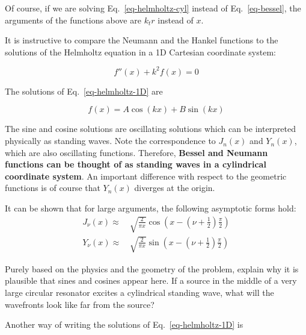 Of course, if we are solving Eq.~\ref{eq-helmholtz-cyl} instead of Eq.~\ref{eq-bessel}, the arguments of the functions above are $k_t r$ instead of $x$.

\pagebreak


It is instructive to compare the Neumann and the Hankel functions to the solutions of the Helmholtz equation in a 1D Cartesian coordinate system:

\begin{equation}
f''(x) + k^2 f(x) = 0 \label{eq-helmholtz-1D}
\end{equation} 

The solutions of Eq.~\ref{eq-helmholtz-1D} are

\begin{equation}
f(x) = A \cos(kx) + B \sin(kx)
\end{equation} 

The sine and cosine solutions are oscillating solutions which can be interpreted physically as standing waves. Note the correspondence to $J_n(x)$ and $Y_n(x)$, which are also oscillating functions. Therefore, \textbf{Bessel and Neumann functions can be thought of as standing waves in a cylindrical coordinate system}. An important difference with respect to the geometric functions is of course that $Y_n(x)$ diverges at the origin.

\begin{exer}
  It can be shown that for large arguments, the following asymptotic forms hold:
\begin{align}
J_\nu(x) \approx & \, \sqrt{\frac{2}{\pi x}} \cos \left( x - \left(\nu + \frac{1}{2}\right)\frac{\pi}{2} \right) \nonumber \\
Y_\nu(x) \approx & \, \sqrt{\frac{2}{\pi x}} \sin \left( x - \left(\nu + \frac{1}{2}\right) \frac{\pi}{2} \right)   
\end{align}

Purely based on the physics and the geometry of the problem, explain why it is plausible that sines and cosines appear here. If a source in the middle of a very large circular resonator excites a cylindrical standing wave, what will the wavefronts look like far from the source?

\end{exer}

Another way of writing the solutions of Eq.~\ref{eq-helmholtz-1D} is

